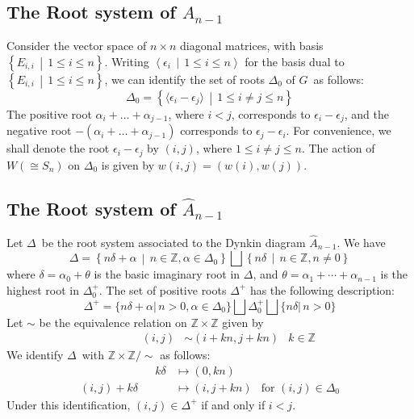 \documentclass[paper=a4, fontsize=10pt]{amsart} %
\theoremstyle{plain}
\theoremstyle{definition}
\theoremstyle{remark}
\numberwithin{equation}{section} %
\numberwithin{figure}{section} %
\numberwithin{table}{section} %
\numberwithin{subsection}{section} %
\def\mid{\,\middle\vert\,}
\def\roots{\ensuremath{\Delta_0}}
\def\proots{\ensuremath{\Delta_0^+}}
\def\Roots{\ensuremath{\Delta}}
\def\gl{\ensuremath{G}}
\def\E{\ensuremath{E}}
\begin{document}
\subsection{The Root system of $A_{n-1}$}
\label{rootSystemA}
Consider the vector space of $n\times n$ diagonal matrices, with basis $\left\{\E_{i,i}\mid 1\leq i\leq n\right\}$.
Writing $\left\langle\epsilon_i\mid 1\leq i\leq n\right\rangle$ for the basis dual to $\left\{\E_{i,i}\mid 1\leq i\leq n\right\}$, we can identify the set of roots $\roots$ of \gl\ as follows:
$$\roots=\left\{\langle\epsilon_i-\epsilon_j\rangle\mid 1\leq i\neq j\leq n\right\}$$
The positive root $\alpha_i+\ldots+\alpha_{j-1}$, where $i<j$, corresponds to $\epsilon_i-\epsilon_j$, and the negative root $-(\alpha_i+\ldots+\alpha_{j-1})$ corresponds to $\epsilon_j-\epsilon_i$.
For convenience, we shall denote the root $\epsilon_i-\epsilon_j$ by $(i,j)$, where $1\leq i\neq j\leq n$.
The action of $W(\cong S_n)$ on $\roots$ is given by $w(i,j)=(w(i),w(j))$.

\subsection{The Root system of $\widehat A_{n-1}$}
Let \Roots\ be the root system associated to the Dynkin diagram $\widehat A_{n-1}$.
We have 
$$\Roots=\left\{n\delta+\alpha\mid n\in\mathbb Z,\alpha\in\roots\right\}\bigsqcup\left\{n\delta\mid n\in\mathbb Z, n\neq0\right\}$$ 
where $\delta=\alpha_0+\theta$ is the basic imaginary root in \Roots, and $\theta=\alpha_1+\cdots+\alpha_{n-1}$ is the highest root in \proots.
The set of positive roots $\Delta^+$ has the following description:
$$\Delta^+=\{n\delta+\alpha\vert\, n>0,\alpha\in\roots\}\bigsqcup\proots\bigsqcup\{n\delta\vert\,n>0\}$$
Let $\sim$ be the equivalence relation on $\mathbb Z\times\mathbb Z$ given by \begin{align*}
\hspace{40pt}    (i,j)&\sim(i+kn,j+kn)&k\in\mathbb Z
\end{align*}
We identify \Roots\ with $\mathbb Z\times\mathbb Z/\sim$ as follows:\begin{align}\label{eq:zz}
\hspace{80pt}   k\delta &\mapsto(0,kn)  &   \\
    (i,j)+k\delta       &\mapsto(i,j+kn)&\text{for }(i,j)\in\roots\nonumber
\end{align}
Under this identification, $(i,j)\in\Roots^+$ if and only if $i<j$.
\end{document}
